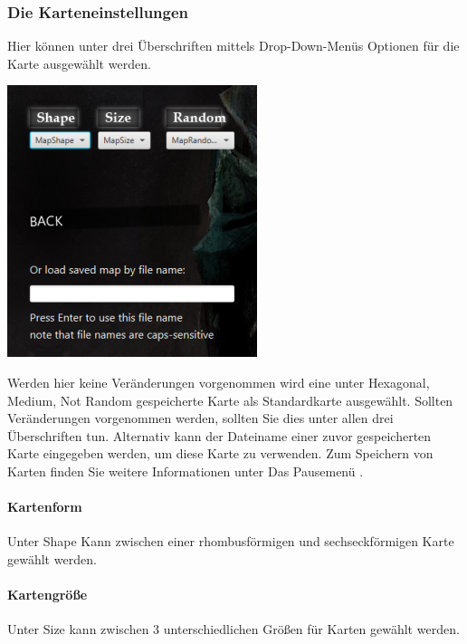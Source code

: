 \documentclass[a4paper,12pt]{scrartcl}
\begin{document}
	
	\subsubsection{Die Karteneinstellungen}
	Hier können unter drei Überschriften mittels Drop-Down-Menüs Optionen für die Karte ausgewählt werden.
	\begin{center}
		\includegraphics{Prog2_EA_V2/screenshots/Karteneinstellungen.png}
	\end{center}
	
	Werden hier keine Veränderungen vorgenommen wird eine unter \glqq Hexagonal, Medium, Not Random\grqq\hspace{0.05em}  gespeicherte Karte als Standardkarte ausgewählt.
	Sollten Veränderungen vorgenommen werden, sollten Sie dies unter allen drei Überschriften tun.
	Alternativ kann der Dateiname einer zuvor gespeicherten Karte eingegeben werden, um diese Karte zu verwenden.
	Zum Speichern von Karten finden Sie weitere Informationen unter \glqq Das Pausemenü\grqq\hspace{0.05em} .
	
	\paragraph{Kartenform}
	Unter \glqq Shape\grqq\hspace{0.05em}  Kann zwischen einer rhombusförmigen und sechseckförmigen Karte gewählt werden.
	
	\paragraph{Kartengröße}
	Unter \glqq Size\grqq\hspace{0.05em}  kann zwischen 3 unterschiedlichen Größen für Karten gewählt werden.
	
\end{document}
